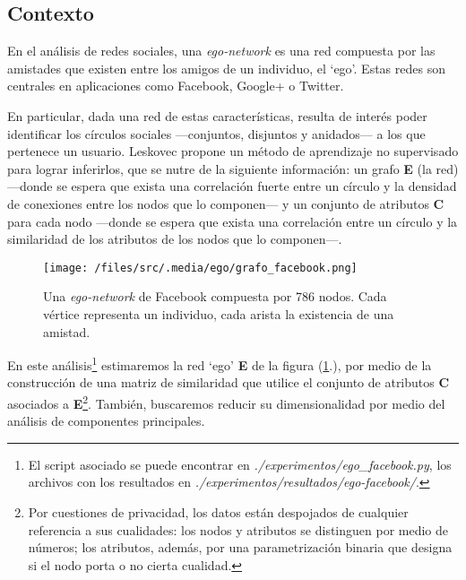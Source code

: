 
\vspace{2em}
\subsection{Contexto} 

En el análisis de redes sociales, una \textit{ego-network} \cite{Leskovec} es una red compuesta por las amistades que existen entre los amigos de un individuo, el `ego'. Estas redes son centrales en aplicaciones como Facebook, Google+ o Twitter. 

\vspace{1em}
En particular, dada una red de estas características, resulta de interés poder identificar los círculos sociales ---conjuntos, disjuntos y anidados--- a los que pertenece un usuario. Leskovec \cite{Leskovec} propone un método de aprendizaje no supervisado para lograr inferirlos, que se nutre de la siguiente información: un grafo \textbf{E} (la red) ---donde se espera que exista una correlación fuerte entre un círculo y la densidad de conexiones entre los nodos que lo componen--- y un conjunto de atributos \textbf{C} para cada nodo ---donde se espera que exista una correlación entre un círculo y la similaridad de los atributos de los nodos que lo componen---.

\vspace{1em}
\begin{figure}[!htbp]
\texttt{[image: /files/src/.media/ego/grafo\_facebook.png]}
\caption{Una \textit{ego-network} de Facebook compuesta por 786 nodos. Cada vértice representa un individuo, cada arista la existencia de una amistad.} \label{ego_facebook}
\end{figure}

\vspace{1em}
En este análisis\footnote{El script asociado se puede encontrar en \textit{./experimentos/ego\_facebook.py}, los archivos con los resultados  en \textit{./experimentos/resultados/ego-facebook/}.} estimaremos la red `ego' \textbf{E} de la figura (\ref{ego_facebook}.), por medio de la construcción de una matriz de similaridad que utilice el conjunto de atributos \textbf{C} asociados a \textbf{E}\footnote{Por cuestiones de privacidad, los datos están despojados de cualquier referencia a sus cualidades: los nodos y atributos se distinguen por medio de números; los atributos, además, por una parametrización binaria que designa si el nodo porta o no cierta cualidad.}. También, buscaremos reducir su dimensionalidad por medio del análisis de componentes principales.




